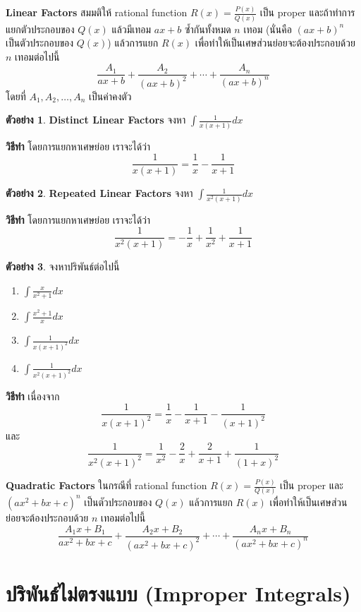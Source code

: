 \documentclass[
]{book}
\theoremstyle{definition}
\theoremstyle{definition}
\newtheorem{example}{ตัวอย่าง}[chapter]
\theoremstyle{definition}
\theoremstyle{definition}
\theoremstyle{remark}
\begin{document}
\textbf{Linear Factors} สมมติให้ rational function \(R(x) = \frac{P(x)}{Q(x)}\)
เป็น proper และถ้าทำการแยกตัวประกอบของ \(Q(x)\) แล้วมีเทอม \(ax + b\) ซ้ำกันทั้งหมด
\(n\) เทอม (นั่นคือ \((ax +b)^n\) เป็นตัวประกอบของ \(Q(x)\)) แล้วการแยก \(R(x)\)
เพื่อทำให้เป็นเศษส่วนย่อยจะต้องประกอบด้วย \(n\) เทอมต่อไปนี้
\[\frac{A_1}{ax+b} +  \frac{A_2}{(ax+b)^2} + \cdots +  \frac{A_n}{(ax+b)^n}\]
โดยที่ \(A_1, A_2, \ldots, A_n\) เป็นค่าคงตัว

\begin{example}
\textbf{Distinct Linear Factors} จงหา \(\int\frac{1}{x(x+1)} dx\)
\end{example}

\textbf{วิธีทำ} โดยการแยกหาเศษย่อย เราจะได้ว่า
\[\frac{1}{x(x+1)} = \frac{1}{x} - \frac{1}{x+1}\]

\begin{example}
\textbf{Repeated Linear Factors} จงหา \(\int\frac{1}{x^2(x+1)} dx\)
\end{example}

\textbf{วิธีทำ} โดยการแยกหาเศษย่อย เราจะได้ว่า
\[\frac{1}{x^2(x+1)} = -\frac{1}{x} + \frac{1}{x^2} + \frac{1}{x+1}\]

\begin{example}

จงหาปริพันธ์ต่อไปนี้

\begin{enumerate}
\def\labelenumi{\arabic{enumi}.}
\item
  \(\int \frac{x}{x^2+1} dx\)
\item
  \(\int \frac{x^2+1}{x} dx\)
\item
  \(\int \frac{1}{x(x+1)^2} dx\)
\item
  \(\int \frac{1}{x^2(x+1)^2} dx\)
\end{enumerate}

\end{example}

\textbf{วิธีทำ} เนื่องจาก
\[\frac{1}{x(x+1)^2} = \frac{1}{x} -\frac{1}{x+1} -\frac{1}{(x+1)^2}\]
และ
\[\frac{1}{x^2(x+1)^2} = \frac{1}{x^2} - \frac{2}{x} + \frac{2}{x+1} + \frac{1}{(1+x)^2}\]

\textbf{Quadratic Factors} ในกรณีที่ rational function
\(R(x) = \frac{P(x)}{Q(x)}\) เป็น proper และ \((ax^2 +bx+c)^n\)
เป็นตัวประกอบของ \(Q(x)\) แล้วการแยก \(R(x)\) เพื่อทำให้เป็นเศษส่วนย่อยจะต้องประกอบด้วย
\(n\) เทอมต่อไปนี้
\[\frac{A_1x + B_1}{ax^2+bx+c} +  \frac{A_2x + B_2}{({ax^2+bx+c})^2} + \cdots +  \frac{A_nx + B_n}{({ax^2+bx+c})^n}\]

\section{ปริพันธ์ไม่ตรงแบบ (Improper Integrals)}\label{uxe1buxe23uxe1euxe19uxe18uxe44uxe21uxe15uxe23uxe07uxe41uxe1auxe1a-improper-integrals}
\end{document}
